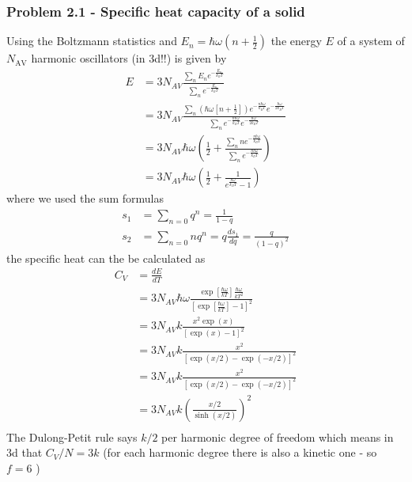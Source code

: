 \documentclass[10pt,a4paper]{article}
\theoremstyle{definition}
\begin{document}
\subsubsection{Problem 2.1 - Specific heat capacity of a solid}
Using the Boltzmann statistics and $E_n=\hbar\omega(n+\frac{1}{2})$ the energy $E$ of a system of $N_\text{AV}$ harmonic oscillators (in 3d!!) is given by 
\begin{align}
    E
    &=3N_{AV}\frac{\sum_nE_ne^{-\frac{E_n}{k_BT}}}{\sum_ne^{-\frac{E_n}{k_{B}T}}}\\
    &=3N_{AV}\frac{\sum_n\left(\hbar\omega\left[n+\frac{1}{2}\right]\right)e^{-\frac{n\hbar\omega}{k_BT}}e^{-\frac{\hbar\omega}{2k_BT}}}{\sum_ne^{-\frac{n\hbar\omega}{k_BT}}e^{-\frac{\hbar\omega}{2k_BT}}}\\
    &=3N_{AV}\hbar\omega\left(\frac{1}{2}+\frac{\sum_n ne^{-\frac{n\hbar\omega}{k_BT}}}{\sum_ne^{-\frac{n\hbar\omega}{k_BT}}}\right)\\
    &=3N_{AV}\hbar\omega\left(\frac{1}{2}+\frac{1}{e^{\frac{\hbar\omega}{k_BT}}-1}\right)
\end{align}
where we used the sum formulas
\begin{align}
    s_1&=\sum_{n=0}q^n=\frac{1}{1-q}\\
    s_2&=\sum_{n=0}nq^n=q\frac{ds_1}{dq}=\frac{q}{(1-q)^2}
\end{align}
the specific heat can the be calculated as
\begin{align}
    C_V&=\frac{dE}{dT}\\
    &=3N_{AV}\hbar\omega\frac{\exp\left[\frac{\hbar\omega}{kT}\right]\frac{\hbar\omega}{kT^2}}{\left[\exp\left[\frac{\hbar\omega}{kT}\right]-1\right]^2}\\
    &=3N_{AV}k\frac{x^2\exp(x)}{\left[\exp(x)-1\right]^2}\\
    &=3N_{AV}k\frac{x^2}{\left[\exp(x/2)-\exp(-x/2)\right]^2}\\
    &=3N_{AV}k\frac{x^2}{\left[\exp(x/2)-\exp(-x/2)\right]^2}\\
    &=3N_{AV}k\left(\frac{x/2}{\sinh(x/2)}\right)^2\\
\end{align}
The Dulong-Petit rule says $k/2$ per harmonic degree of freedom which means in 3d that $C_V/N=3k$ (for each harmonic degree there is also a kinetic one - so $f=6$ )
\begin{center}
\end{center}
\end{document}

